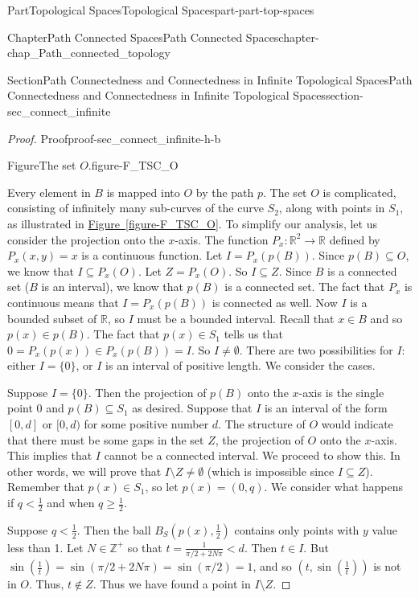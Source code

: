 \documentclass[oneside,10pt,]{book}
\newcommand{\xreffont}{\relax}
\numberwithin{equation}{chapter}
\newcommand{\Z}{\mathbb{Z}}
\newcommand{\R}{\mathbb{R}}
\newcommand{\lt}{<}
\begin{document}
\begin{partptx}{Part}{Topological Spaces}{}{Topological Spaces}{}{}{part-part-top-spaces}
\begin{chapterptx}{Chapter}{Path Connected Spaces}{}{Path Connected Spaces}{}{}{chapter-chap_Path_connected_topology}
\begin{sectionptx}{Section}{Path Connectedness and Connectedness in Infinite Topological Spaces}{}{Path Connectedness and Connectedness in Infinite Topological Spaces}{}{}{section-sec_connect_infinite}
\begin{proof}{Proof}{}{proof-sec_connect_infinite-h-b}
\begin{figureptx}{Figure}{The set \(O\).}{figure-F_TSC_O}{}
\tcblower
\end{figureptx}%
Every element in \(B\) is mapped into \(O\) by the path \(p\). The set \(O\) is complicated, consisting of infinitely many sub-curves of the curve \(S_2\), along with points in \(S_1\), as illustrated in \hyperref[figure-F_TSC_O]{Figure~{\xreffont\ref{figure-F_TSC_O}}}. To simplify our analysis, let us consider the projection onto the \(x\)-axis. The function \(P_x : \R^2 \to \R\) defined by \(P_x(x,y) = x\) is a continuous function. Let \(I = P_x(p(B))\). Since \(p(B) \subseteq O\), we know that \(I \subseteq P_x(O)\). Let \(Z = P_x(O)\). So \(I \subseteq Z\). Since \(B\) is a connected set (\(B\) is an interval), we know that \(p(B)\) is a connected set. The fact that \(P_x\) is continuous means that \(I = P_x(p(B))\) is connected as well. Now \(I\) is a bounded subset of \(\R\), so \(I\) must be a bounded interval. Recall that \(x \in B\) and so \(p(x) \in p(B)\). The fact that \(p(x) \in S_1\) tells us that \(0 = P_x(p(x)) \in P_x(p(B)) = I\). So \(I \neq \emptyset\). There are two possibilities for \(I\): either \(I = \{0\}\), or \(I\) is an interval of positive length. We consider the cases.%
\par
Suppose \(I = \{0\}\). Then the projection of \(p(B)\) onto the \(x\)-axis is the single point \(0\) and \(p(B) \subseteq S_1\) as desired. Suppose that \(I\) is an interval of the form \([0,d]\) or \([0,d)\) for some positive number \(d\). The structure of \(O\) would indicate that there must be some gaps in the set \(Z\), the projection of \(O\) onto the \(x\)-axis. This implies that \(I\) cannot be a connected interval. We proceed to show this. In other words, we will prove that \(I \setminus Z \neq \emptyset\) (which is impossible since \(I \subseteq Z\)). Remember that \(p(x) \in S_1\), so let \(p(x) = (0, q)\). We consider what happens if \(q \lt \frac{1}{2}\) and when \(q \geq \frac{1}{2}\).%
\par
Suppose \(q \lt \frac{1}{2}\). Then the ball \(B_S\left(p(x), \frac{1}{2}\right)\) contains only points with \(y\) value less than 1. Let \(N \in \Z^+\) so that \(t=\frac{1}{\pi/2+2N\pi} \lt d\). Then \(t \in I\). But \(\sin\left(\frac{1}{t}\right) = \sin(\pi/2 + 2N\pi) = \sin(\pi/2) = 1\), and so \(\left(t,\sin\left(\frac{1}{t}\right)\right)\) is not in \(O\). Thus, \(t \notin Z\). Thus we have found a point in \(I \setminus Z\).%
\par

\end{proof}
\end{sectionptx}
\end{chapterptx}
\end{partptx}
\end{document}
